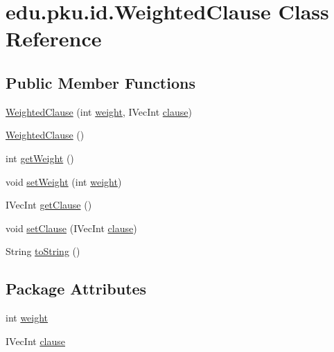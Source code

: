 \hypertarget{classedu_1_1pku_1_1id_1_1_weighted_clause}{
\section{edu.pku.id.WeightedClause Class Reference}
\label{classedu_1_1pku_1_1id_1_1_weighted_clause}
}
\subsection*{Public Member Functions}
\begin{DoxyCompactItemize}
\item 
\hyperlink{classedu_1_1pku_1_1id_1_1_weighted_clause_ac8c51ec9ff9513a228cc8284e4d3b0cc}{WeightedClause} (int \hyperlink{classedu_1_1pku_1_1id_1_1_weighted_clause_a392dc5014ecd9d60ef6d777b5f182b6f}{weight}, IVecInt \hyperlink{classedu_1_1pku_1_1id_1_1_weighted_clause_a82434b1a30e9c47d235945f932ba8ca5}{clause})
\item 
\hyperlink{classedu_1_1pku_1_1id_1_1_weighted_clause_af0169de66ce7d9ac5a0660823f787606}{WeightedClause} ()
\item 
int \hyperlink{classedu_1_1pku_1_1id_1_1_weighted_clause_a6624b4d9b13942eb4c012015db1da532}{getWeight} ()
\item 
void \hyperlink{classedu_1_1pku_1_1id_1_1_weighted_clause_a16d097b3ae93997fa34c7481a01f311b}{setWeight} (int \hyperlink{classedu_1_1pku_1_1id_1_1_weighted_clause_a392dc5014ecd9d60ef6d777b5f182b6f}{weight})
\item 
IVecInt \hyperlink{classedu_1_1pku_1_1id_1_1_weighted_clause_a2335f7dc5ddf1725bf28a6cd4b60aea7}{getClause} ()
\item 
void \hyperlink{classedu_1_1pku_1_1id_1_1_weighted_clause_a8de57c06ebc286193b7f29c89f42f6c9}{setClause} (IVecInt \hyperlink{classedu_1_1pku_1_1id_1_1_weighted_clause_a82434b1a30e9c47d235945f932ba8ca5}{clause})
\item 
String \hyperlink{classedu_1_1pku_1_1id_1_1_weighted_clause_afcc77b664c0f685b1327fa0d14435d9d}{toString} ()
\end{DoxyCompactItemize}
\subsection*{Package Attributes}
\begin{DoxyCompactItemize}
\item 
int \hyperlink{classedu_1_1pku_1_1id_1_1_weighted_clause_a392dc5014ecd9d60ef6d777b5f182b6f}{weight}
\item 
IVecInt \hyperlink{classedu_1_1pku_1_1id_1_1_weighted_clause_a82434b1a30e9c47d235945f932ba8ca5}{clause}
\end{DoxyCompactItemize}



